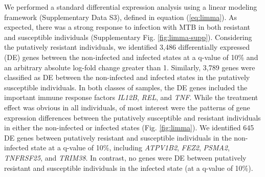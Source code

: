 \documentclass[fleqn,10pt]{wlscirep}
\begin{document}
We performed a standard differential expression analysis using a
linear modeling framework (Supplementary Data S3), defined in equation
(\ref{eq:limma}). As expected, there was a strong response to
infection with MTB in both resistant and susceptible individuals
(Supplementary Fig. \ref{fig:limma-supp}). Considering the putatively
resistant individuals, we identified 3,486 differentially expressed
(DE) genes between the non-infected and infected states at a q-value
of 10\% and an arbitrary absolute log-fold change greater than 1.
Similarly, 3,789 genes were classified as DE between the non-infected
and infected states in the putatively susceptible individuals. In both
classes of samples, the DE genes included the important immune
response factors \emph{IL12B}, \emph{REL}, and \emph{TNF}. While the
treatment effect was obvious in all individuals, of most interest were
the patterns of gene expression differences between the putatively
susceptible and resistant individuals in either the non-infected or
infected states (Fig. \ref{fig:limma}). We identified 645 DE genes
between putatively resistant and susceptible individuals in the
non-infected state at a q-value of 10\%, including \emph{ATPV1B2},
\emph{FEZ2}, \emph{PSMA2}, \emph{TNFRSF25}, and \emph{TRIM38}. In
contrast, no genes were DE between putatively resistant and
susceptible individuals in the infected state (at a q-value of 10\%).
\end{document}
